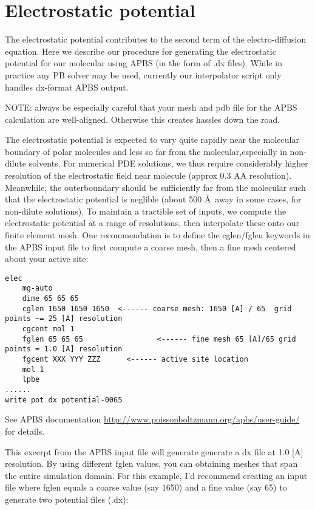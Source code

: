 \documentclass{article}
\begin{document}
\section{Electrostatic potential}
\label{electropot}
The electrostatic potential contributes to the second term of the electro-diffusion equation. Here we describe our procedure for generating the electrostatic potential for our molecular using APBS (in the form of .dx files). While in practice any PB solver may be used, currently our interpolator script only handles dx-format APBS output. 

NOTE: always be especially careful that your mesh and pdb file for the APBS calculation are
well-aligned. Otherwise this creates hassles down the road.

The electrostatic potential is expected to vary quite rapidly near the molecular boundary of polar molecules and less so far from the molecular,especially in non-dilute solvents. For numerical PDE solutions, we thus require considerably higher resolution of the electrostatic field near molecule (approx 0.3 AA resolution). Meanwhile, the outerboundary should be sufficiently far from the molecular such that the electrostatic potential is neglible (about 500 \AA\ away in some cases, for non-dilute solutions). To maintain a tractible set of inputs, we compute the electrostatic potential at a range of resolutions, then interpolate these onto our finite element mesh. One recommendation is to define the cglen/fglen keywords in the APBS input file to first compute a coarse mesh, then a fine mesh centered about your active site:
\begin{verbatim}
elec
    mg-auto
    dime 65 65 65
    cglen 1650 1650 1650  <------ coarse mesh: 1650 [A] / 65  grid points ~= 25 [A] resolution
    cgcent mol 1
    fglen 65 65 65                 <------ fine mesh 65 [A]/65 grid points = 1.0 [A] resolution 
    fgcent XXX YYY ZZZ      <------ active site location
    mol 1
    lpbe
......
write pot dx potential-0065

\end{verbatim}

See APBS documentation \url{http://www.poissonboltzmann.org/apbs/user-guide/} for details.


This excerpt from the APBS input file will generate generate a dx file at 1.0 [A] resolution. By using different fglen values, you can obtaining meshes that span the entire simulation domain. For this example, I'd recommend creating an input file where fglen equals a coarse value (say 1650) and a fine value (say 65) to generate two potential files (.dx):
\end{document}
